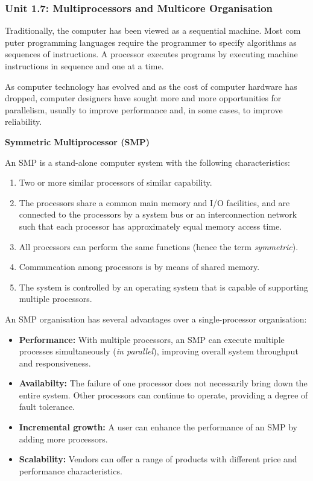 \documentclass{article}
\begin{document}
\subsubsection*{Unit 1.7: Multiprocessors and Multicore Organisation}
{}

Traditionally, the computer has been viewed as a sequential machine. Most com
puter programming languages require the programmer to specify algorithms as 
sequences of instructions. A processor executes programs by executing machine 
instructions in sequence and one at a time. 

As computer technology has evolved and as the cost of computer hardware has 
dropped, computer designers have sought more and more opportunities for parallelism, 
usually to improve performance and, in some cases, to improve reliability.

\begin{definitionbox}
    \textbf{Symmetric Multiprocessor (SMP)}

    An SMP is a stand-alone computer system with the following characteristics:
    \begin{enumerate}
        \item Two or more similar processors of similar capability.
        \item The processors share a common main memory and I/O facilities, and are connected to the processors 
        by a system bus or an interconnection network such that each processor has approximately equal memory access time.
        \item All processors can perform the same functions (hence the term \textit{symmetric}).
        \item Communcation among processors is by means of shared memory.
        \item The system is controlled by an operating system that is capable of supporting multiple processors.
    \end{enumerate}
\end{definitionbox}

\newpage

An SMP organisation has several advantages over a single-processor organisation:
\begin{itemize}
    \item \textbf{Performance:} With multiple processors, an SMP can execute multiple processes simultaneously (\textit{in parallel}), improving overall system throughput and responsiveness.
    \item \textbf{Availabilty:} The failure of one processor does not necessarily bring down the entire system. Other processors can continue to operate, providing a degree of fault tolerance.
    \item \textbf{Incremental growth:} A user can enhance the performance of an SMP by adding more processors.
    \item \textbf{Scalability:} Vendors can offer a range of products with different price and performance characteristics.
\end{itemize}
\end{document}
